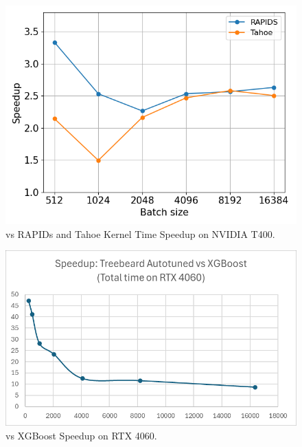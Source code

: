 \begin{figure}[htb]
  \centering
  \includegraphics[width=0.75\linewidth]{figures/geomean_speedup_T400_kernel_time.png}
  \caption{\Treebeard{} vs RAPIDs and Tahoe Kernel Time Speedup on NVIDIA T400.}
  \label{Fig:TBvsRAPIDsTahoe_T400_Speedup}
\end{figure}


\begin{figure}[htb]
  \centering
  \includegraphics[width=0.75\linewidth]{figures/TBvsXGB_TotalTime.png}
  \caption{\Treebeard{} vs XGBoost Speedup on RTX 4060.}
  \label{Fig:TBvsXGBoost_Speedup}
\end{figure}

